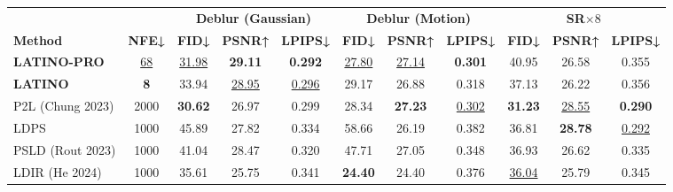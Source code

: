 \documentclass[varwidth, crop, margin=10pt]{standalone}
\begin{document}
\begin{table*}[h]
\centering \setlength{\tabcolsep}{4pt}

\begin{tabular}{lcccccccccc}
 \toprule
 &  & \multicolumn{3}{c}{\textbf{Deblur (Gaussian)}} & \multicolumn{3}{c}{\textbf{Deblur (Motion)}} & \multicolumn{3}{c}{\textbf{SR$\times8$}} \\ %
  \cmidrule(lr){3-5} \cmidrule(lr){6-8} \cmidrule(lr){9-11}
\textbf{Method} & \textbf{NFE↓} & \textbf{FID↓} & \textbf{PSNR↑} & \textbf{LPIPS↓} & \textbf{FID↓} & \textbf{PSNR↑} & \textbf{LPIPS↓} & \textbf{FID↓} & \textbf{PSNR↑} & \textbf{LPIPS↓}\\ \hline
\textbf{LATINO-PRO} &  \underline{68}  &    \underline{31.98}    &    \textbf{29.11}    & \textbf{0.292}  & \underline{27.80}     &   \underline{27.14}       & \textbf{0.301}        & 40.95     &   26.58        & 0.355           \\ %
\textbf{LATINO}       &  \textbf{8}   & 33.94 &    \underline{28.95}                  & \underline{0.296} &  29.17 &   26.88  & 0.318   & 37.13     &   26.22      &    0.356     \\ \hline
P2L (Chung 2023) &  2000    &  \textbf{30.62}  &   26.97              & 0.299  &  28.34  & \textbf{27.23}            & \underline{0.302}   & \textbf{31.23}     &   \underline{28.55}       &    \textbf{0.290}    \\ %
LDPS & 1000 &  45.89  &  27.82   & 0.334  &   58.66   &   26.19      & 0.382   & 36.81     &   \textbf{28.78}       &   \underline{0.292}     \\ %
PSLD (Rout 2023)       &  1000   &   41.04  & 28.47   & 0.320    &   47.71   & 27.05   & 0.348   & 36.93   & 26.62   &   0.335     \\ %
LDIR (He 2024)   &  1000   &   35.61   &      25.75                  & 0.341    &    \textbf{24.40}     & 24.40        & 0.376     & \underline{36.04}   & 25.79      & 0.345     \\ %
\bottomrule
\end{tabular}
\end{table*}
\end{document}
